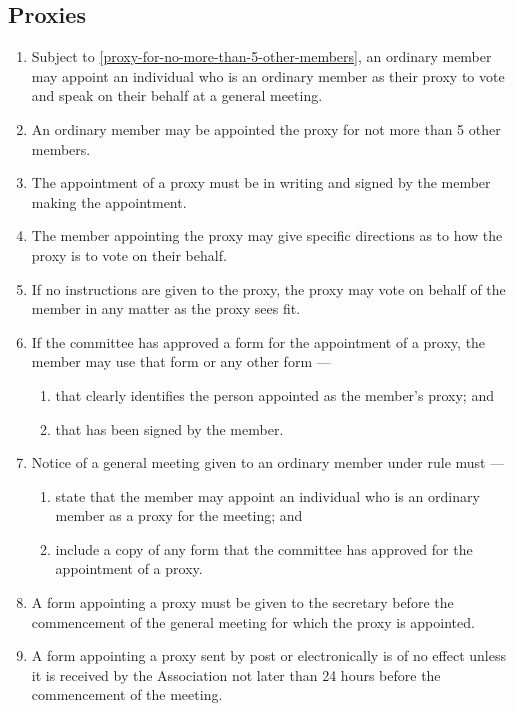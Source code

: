 \documentclass[../constitution.tex]{subfiles}
\begin{document}
\hypertarget{proxies}{%
\subsection{Proxies}\label{proxies}}

\begin{enumerate}

\item Subject to  \ref{proxy-for-no-more-than-5-other-members}, an ordinary member may appoint an individual who is an ordinary member  as their proxy to vote and speak on their behalf at a general meeting.
\item An ordinary member may be appointed the proxy for not more than 5 other members. \label{proxy-for-no-more-than-5-other-members}
\item The appointment of a proxy must be in writing and signed by the member making the appointment.
\item The member appointing the proxy may give specific directions as to how the proxy is to vote on their behalf.
\item If no instructions are given to the proxy, the proxy may vote on behalf of the member in any matter as the proxy sees fit.
\item If the committee has approved a form for the appointment of a proxy, the member may use that form or any other form ---

  \begin{enumerate}
  
  \item that clearly identifies the person appointed as the member's proxy; and
  \item that has been signed by the member.
  \end{enumerate}
\item Notice of a general meeting given to an ordinary member under rule  must --- \label{notice-of-meeting-to-appointed-proxy}

  \begin{enumerate}
  
  \item state that the member may appoint an individual who is an ordinary member as a proxy for the meeting; and
  \item include a copy of any form that the committee has approved for the appointment of a proxy.
  \end{enumerate}
\item A form appointing a proxy must be given to the secretary before the commencement of the general meeting for which the proxy is appointed. \label{form-appointing-proxy-before-general-meeting}
\item A form appointing a proxy sent by post or electronically is of no effect unless it is received by the Association not later than 24 hours before the commencement of the meeting.
\end{enumerate}
\end{document}
